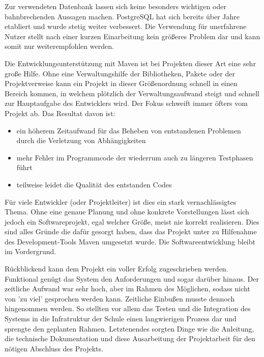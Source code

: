 Zur verwendeten Datenbank lassen sich keine besonders wichtigen oder bahnbrechenden Aussagen machen. PostgreSQL hat sich bereits über Jahre etabliert und wurde stetig weiter verbessert. 
Die Verwendung für unerfahrene Nutzer stellt nach einer kurzen Einarbeitung kein größeres Problem dar und kann somit nur weiterempfohlen werden. 
 
Die Entwicklungsunterstützung mit Maven ist bei Projekten dieser Art eine sehr große Hilfe.
Ohne eine Verwaltungshilfe der Bibliotheken, Pakete oder der Projektverweise kann ein Projekt in dieser Größenordnung schnell in einen Bereich kommen, in welchem plötzlich der Verwaltungsaufwand steigt und schnell zur Hauptaufgabe des Entwicklers wird.
Der Fokus schweift immer öfters vom Projekt ab. Das Resultat davon ist:
\begin{itemize}
	\item ein höherem Zeitaufwand für das Beheben von entstandenen Problemen durch die Verletzung von Abhängigkeiten 
	\item mehr Fehler im Programmcode der wiederrum auch zu längeren Testphasen führt
	\item teilweise leidet die Qualität des entstanden Codes 
\end{itemize}
Für viele Entwickler (oder Projektleiter) ist dies ein stark vernachlässigtes Thema.
Ohne eine genaue Planung und ohne konkrete Vorstellungen lässt sich jedoch ein Softwareprojekt, egal welcher Größe, meist nie korrekt realisieren.  
Dies sind alles Gründe die dafür gesorgt haben, dass das Projekt unter zu Hilfenahme des Development-Tools Maven umgesetzt wurde.
Die Softwareentwicklung bleibt im Vordergrund.

Rückblickend kann dem Projekt ein voller Erfolg zugeschrieben werden.
Funktional genügt das System den Anforderungen und sogar darüber hinaus. Der zeitliche Aufwand war sehr hoch, aber im Rahmen des Möglichen, sodass nicht von 'zu viel' gesprochen werden kann.
Zeitliche Einbußen musste dennoch hingenommen werden. So stellten vor allem das Testen und die Integration des Systems in die Infratruktur der Schule einen langwierigen Prozess dar und sprengte den geplanten Rahmen.
Letztenendes sorgten Dinge wie die Anleitung, die technische Dokumentation und diese Ausarbeitung der Projektarbeit für den nötigen Abschluss des Projekts.
